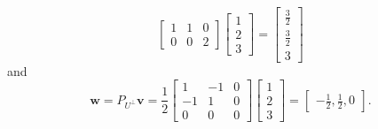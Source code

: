 \documentclass[12pt]{article}
\begin{document}
\begin{enumerate}[label=(\alph*)]
\[\begin{bmatrix}
			1&1&0\\
			0&0&2
		\end{bmatrix}
		\begin{bmatrix}
			1\\2\\3
		\end{bmatrix}
		=
		\begin{bmatrix}
			\frac{3}{2}\\\frac{3}{2}\\3
		\end{bmatrix}
	\]
	and
	\[
		\mathbf{w}=P_{U^\perp}\mathbf{v}=
		\frac{1}{2}
		\begin{bmatrix}
			1&-1&0\\
			-1&1&0\\
			0&0&0
		\end{bmatrix}
		\begin{bmatrix}
			1\\2\\3
		\end{bmatrix}=
		\begin{bmatrix}
			-\frac{1}{2},\frac{1}{2},0
		\end{bmatrix}.
	\]
\end{enumerate}
\end{document}
